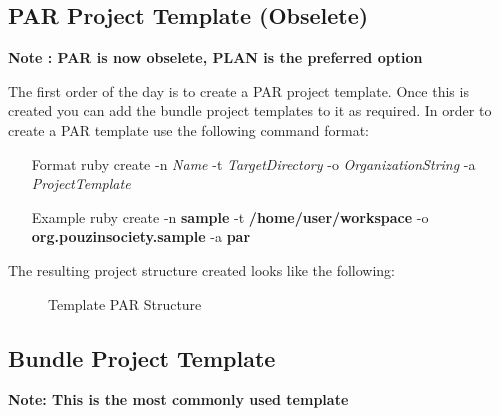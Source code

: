 \subsection{PAR Project Template (Obselete)}
\begin{center}
\textbf{Note : PAR is now obselete, PLAN is the preferred option}
\end{center}

The first order of the day is to create a PAR project template. Once this is created you can add the bundle project templates to it as required. In order to create a PAR template use the following command format:

\begin{enumerate}
 \item[Format] ruby create -n \emph{Name} -t \emph{TargetDirectory} -o \emph{ OrganizationString} -a \emph{ProjectTemplate}
 \item[Example]ruby create -n \textbf{sample} -t \textbf{/home/user/workspace} -o \textbf{org.pouzinsociety.sample} -a \textbf{par}
\end{enumerate}

The resulting project structure created looks like the following:

\begin{figure}[H]
\caption{Template PAR Structure}
\end{figure}

\subsection{Bundle Project Template}

\begin{center}
\textbf{Note: This is the most commonly used template}
\end{center}

